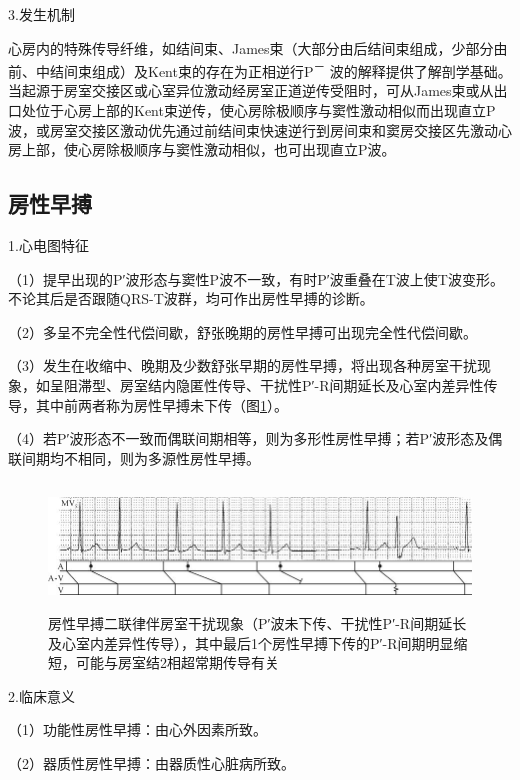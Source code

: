 3.发生机制

心房内的特殊传导纤维，如结间束、James束（大部分由后结间束组成，少部分由前、中结间束组成）及Kent束的存在为正相逆行P\textsuperscript{－}
波的解释提供了解剖学基础。当起源于房室交接区或心室异位激动经房室正道逆传受阻时，可从James束或从出口处位于心房上部的Kent束逆传，使心房除极顺序与窦性激动相似而出现直立P波，或房室交接区激动优先通过前结间束快速逆行到房间束和窦房交接区先激动心房上部，使心房除极顺序与窦性激动相似，也可出现直立P波。

\protect\hypertarget{text00007.htmlux5cux23subid22}{}{}

\subsection{房性早搏}

1.心电图特征

（1）提早出现的P′波形态与窦性P波不一致，有时P′波重叠在T波上使T波变形。不论其后是否跟随QRS-T波群，均可作出房性早搏的诊断。

（2）多呈不完全性代偿间歇，舒张晚期的房性早搏可出现完全性代偿间歇。

（3）发生在收缩中、晚期及少数舒张早期的房性早搏，将出现各种房室干扰现象，如呈阻滞型、房室结内隐匿性传导、干扰性P′-R间期延长及心室内差异性传导，其中前两者称为房性早搏未下传（图\ref{fig1-25}）。

（4）若P′波形态不一致而偶联间期相等，则为多形性房性早搏；若P′波形态及偶联间期均不相同，则为多源性房性早搏。

\begin{figure}[!htbp]
 \centering
 \includegraphics[width=5.73958in,height=1.32292in]{./images/Image00031.jpg}
 \captionsetup{justification=centering}
 \caption{房性早搏二联律伴房室干扰现象（P′波未下传、干扰性P′-R间期延长及心室内差异性传导），其中最后1个房性早搏下传的P′-R间期明显缩短，可能与房室结2相超常期传导有关}
 \label{fig1-25}
  \end{figure} 

2.临床意义

（1）功能性房性早搏：由心外因素所致。

（2）器质性房性早搏：由器质性心脏病所致。

